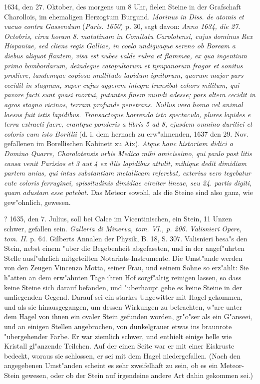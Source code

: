 \documentclass[a4paper, 11pt, oneside, polutonikogreek, german]{article}
\begin{document}
1634, den 27. Oktober, des morgens um 8 Uhr, fielen Steine in der Grafschaft Charollois, im ehemaligen Herzogtum Burgund. \emph{Morinus in Diss. de atomis et vacuo contra Gassendum} (\emph{Paris. 1650}) p. 30, sagt davon: \emph{Anno 1634, die 27. Octobris, circa horam 8. matutinam in Comitatu Carolotensi, cujus dominus Rex Hispaniae, sed cliens regis Galliae, in coelo undiquaque sereno ob Boream a diebus aliquot flantem, visa est nubes valde rubra et flammea, ex qua ingentium primo bombardarum, deindeque catapultarum et tympanorum fragor et sonitus prodiere, tandemque copiosa multitudo lapidum ignitorum, quorum major pars cecidit in stagnum, super cujus aggerem integra transibat cohors militum, qui pavore facti sunt quasi mortui, putantes finem mundi adesse; pars altera cecidit in agros stagno vicinos, terram profunde penetrans. Nullus vero homo vel animal laesus fuit istis lapidibus. Transactoque horrendo isto spectaculo, plures lapides e terra extracti fuere, erantque ponderis a libris 5 ad 8, ejusdem omnino duritiei et coloris cum isto Borillii} (d. i. dem hernach zu erw"ahnenden, 1637 den 29. Nov. gefallenen im Borellischen Kabinett zu Aix). \emph{Atque hanc historiam didici a Domino Quarre, Charolotensis urbis Medico mihi amicissimo, qui paulo post litis causa venit Parisios et 3 aut 4 ex illis lapidibus attulit, mihique dedit dimidiam partem unius, qui intus substantiam metallicam referebat, exterius vero tegebatur cute coloris ferruginei, spissitudinis dimidiae circiter lineae, seu 24. partis digiti, quam adustam esse patebat.} Das Meteor sowohl, als die Steine sind also ganz, wie gew"ohnlich, gewesen.

? 1635, den 7. Julius, soll bei Calce im Vicentinischen, ein Stein, 11 Unzen schwer, gefallen sein. \emph{Galleria di Minerva, tom. VI., p. 206. Valisnieri Opere, tom. II.} p. 64. Gilberts Annalen der Physik, B. 18, S. 307. Valisnieri besa"s den Stein, nebst einem "uber die Begebenheit abgefassten, und in der angef"uhrten Stelle ausf"uhrlich mitgeteilten Notariats-Instrumente. Die Umst"ande werden von den Zeugen Vincenzo Motta, seiner Frau, und seinem Sohne so erz"ahlt: Sie h"atten an dem erw"ahnten Tage ihren Hof sorgf"altig reinigen lassen, so dass keine Steine sich darauf befanden, und "uberhaupt gebe es keine Steine in der umliegenden Gegend. Darauf sei ein starkes Ungewitter mit Hagel gekommen, und als sie hinausgegangen, um dessen Wirkungen zu betrachten, w"are unter dem Hagel von ihnen ein ovaler Stein gefunden worden, gr"o"ser als ein G"anseei, und an einigen Stellen angebrochen, von dunkelgrauer etwas ins braunrote "ubergehender Farbe. Er war ziemlich schwer, und enthielt einige helle wie Kristall gl"anzende Teilchen. Auf der einen Seite war er mit einer Eiskruste bedeckt, woraus sie schlossen, er sei mit dem Hagel niedergefallen. (Nach den angegebenen Umst"anden scheint es sehr zweifelhaft zu sein, ob es ein Meteor-Stein gewesen, oder ob der Stein auf irgendeine andere Art dahin gekommen sei.)
\end{document}
